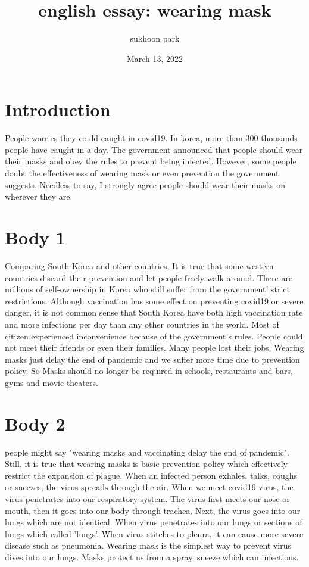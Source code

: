 \documentclass{article}
\begin{document}
\title{english essay: wearing mask}
\author{sukhoon park}
\date{March 13, 2022}

\maketitle

\section{Introduction}
 People worries they could caught in covid19. In korea, more than 300 thousands people have caught in a day. The government announced that people should wear their masks and obey the rules to prevent being infected. However, some people doubt the effectiveness of wearing mask or even prevention the government suggests. Needless to say, I strongly agree people should wear their masks on wherever they are. \\

\section{Body 1}
 Comparing South Korea and other countries,  It is true that some western countries discard their prevention and let people freely walk around. There are millions of self-ownership in Korea who still suffer from the government' strict restrictions. Although vaccination has some effect on preventing covid19 or severe danger, it is not common sense that South Korea have both high vaccination rate and more infections per day than any other countries in the world. Most of citizen experienced inconvenience because of the government's rules. People could not meet their friends or even their families. Many people lost their jobs. Wearing masks just delay the end of pandemic and we suffer more time due to prevention policy. So Masks should no longer be required in schools, restaurants and bars, gyms and movie theaters. 

\section{Body 2}
people might say "wearing masks and vaccinating delay the end of pandemic". Still, it is true that wearing masks is basic prevention policy which effectively restrict the expansion of plague. When an infected person exhales, talks, coughs or sneezes, the virus spreads through the air. When we meet covid19 virus, the virus penetrates into our respiratory system. The virus first meets our nose or mouth, then it goes into our body through trachea. Next, the virus goes into our lungs which are not identical. When virus penetrates into our lungs or sections of lungs which called 'lungs'. When virus stitches to pleura, it can cause more severe disease such as pneumonia. Wearing mask is the simplest way to prevent virus dives into our lungs. Masks protect us from a spray, sneeze which can infectious.
\end{document}
